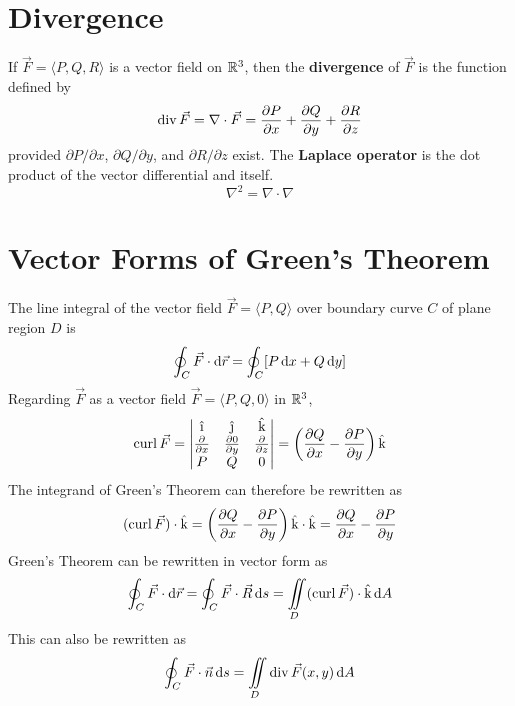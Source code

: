 \documentclass[./Calculus \Roman{3}.tex]{subfiles}
\begin{document}
		\section*{Divergence}
			If $\vec{F} = \langle P, Q, R \rangle$ is a vector field on $\mathbb{R}^3$, then the \textbf{divergence} of $\vec{F}$ is the function defined by
				\[\operatorname{div} \vec{F} = \nabla \cdot \vec{F} = \frac{\partial P}{\partial x} + \frac{\partial Q}{\partial y} + \frac{\partial R}{\partial z}\]
				provided $\partial P/\partial x$, $\partial Q/\partial y$, and $\partial R/ \partial z$ exist.
			The \textbf{Laplace operator} is the dot product of the vector differential and itself.
				\[\nabla^2 = \nabla \cdot \nabla\]
		\section*{Vector Forms of Green's Theorem}
			The line integral of the vector field $\vec{F} = \langle P, Q \rangle$ over boundary curve $C$ of plane region $D$ is
				\[\oint_C \vec{F} \cdot \mathrm{d}\vec{r} = \oint_C[P\,\mathrm{d} x + Q\,\mathrm{d} y]\]
				Regarding $\vec{F}$ as a vector field $\vec{F} = \langle P, Q, 0 \rangle$ in $\mathbb{R}^3$,
				\[
					\curl \vec{F} =
						\begin{vmatrix}
							\vi & \vj & \vk \\
							\pder{}{x} & \pder{0}{y} & \pder{}{z} \\
							P & Q & 0
						\end{vmatrix}
						= \left(\pder{Q}{x} - \pder{P}{y}\right)\vk
				\]
				The integrand of Green's Theorem can therefore be rewritten as
				\[(\operatorname{curl}\vec{F}) \cdot \text{\^k} = \left(\frac{\partial Q}{\partial x} - \frac{\partial P}{\partial y}\right)\text{\^k} \cdot \text{\^k} = \frac{\partial Q}{\partial x} - \frac{\partial P}{\partial y}\]
				Green's Theorem can be rewritten in vector form as
				\[\oint_C \vec{F} \cdot \mathrm{d}\vec{r} = \oint_C \vec{F} \cdot \vec{R}\,\mathrm{d} s = \iint\limits_D (\operatorname{curl}\vec{F}) \cdot \text{\^k} \,\mathrm{d} A\]
				This can also be rewritten as
				\[\oint_C \vec{F} \cdot \vec{n} \,\mathrm{d} s = \iint\limits_D \operatorname{div}\vec{F}(x, y)\,\mathrm{d} A\]
\end{document}
